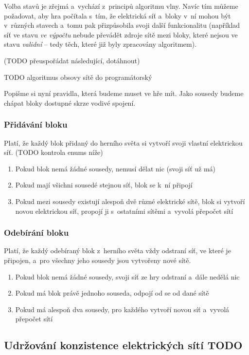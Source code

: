 Volba stavů je zřejmá a~vychází z~principů algoritmu vlny. Navíc tím můžeme požadovat, aby hra počítala s~tím, že elektrická síť a~bloky v~ní mohou být v~různých stavech a~tomu pak přizpůsobila svoji další funkcionalitu (například síť ve stavu \textit{ve výpočtu} nebude převádět zdroje sítě mezi bloky, které nejsou ve stavu \textit{validní} -- tedy těch, které již byly zpracovány algoritmem).


(TODO přeuspořádat následující, dotáhnout)

TODO algoritmus obsovy sítě do programátorský


Popišme si nyní pravidla, která budeme muset ve hře mít. Jako sousedy budeme chápat bloky dostupné skrze vodivé spojení.

\subsubsection{Přidávání bloku}
Platí, že každý blok přidaný do herního světa si vytvoří svoji vlastní elektrickou síť.
(TODO kontrola enums níže)
\begin{enumerate}
	\item Pokud blok nemá žádné sousedy, nemusí dělat nic (svoji síť už má)
	\item Pokud mají všichni sousedé stejnou síť, blok se k~ní připojí
	\item Pokud mezi sousedy existují alespoň dvě různé elektrické sítě, blok si vytvoří novou elektrickou síť, propojí ji s~ostatními sítěmi a~vyvolá přepočet sítí
\end{enumerate}

\subsubsection{Odebírání bloku}
Platí, že každý odebíraný blok z~herního světa vždy odstraní síť, ve které je připojen, a~pro všechny jeho sousedy jsou vytvořeny nové sítě.

\begin{enumerate}
	\item Pokud blok nemá žádné sousedy, svoji síť ze hry odstraní a~dále nedělá nic
	\item Pokud má blok právě jednoho souseda, odpojí od se od dané sítě
	\item Pokud má alespoň dva sousedy, pro každého vytvoří novou síť a~vyvolá přepočet sítí
\end{enumerate}

\subsection{Udržování konzistence elektrických sítí TODO}

